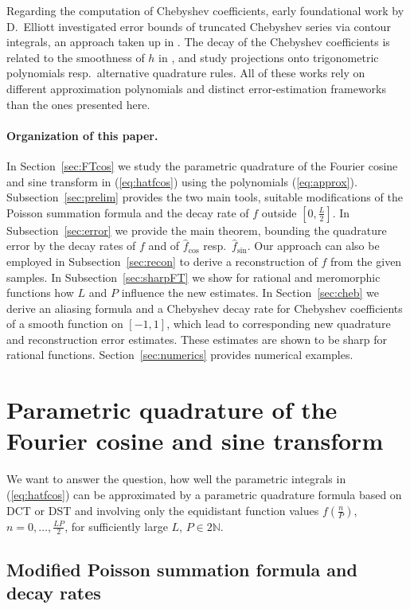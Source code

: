 \documentclass[11pt,a4paper]{scrartcl}
\numberwithin{equation}{section}
\numberwithin{table}{section}
\numberwithin{figure}{section}
\newcommand{\N}{\mathbb N}
\newcommand{\fcos}{{\hat f}_{\cos}}
\newcommand{\fsin}{{\hat f}_{\sin}}
\begin{document}
Regarding the computation of Chebyshev coefficients, early foundational work by D.~Elliott
\cite{El63, El64, El65} investigated error bounds of truncated Chebyshev series via contour
integrals, an approach taken up in \cite{Wang17}. The decay of the Chebyshev coefficients is related to the
smoothness of $h$ in \cite{Ma17}, and \cite{Liu19, Po25} study projections onto trigonometric
polynomials resp.\ alternative quadrature rules. All of these works rely on different
approximation polynomials and distinct error-estimation frameworks than the ones presented here.

\paragraph{Organization of this paper.}
 In Section~\ref{sec:FTcos} we study the parametric quadrature of the Fourier cosine and sine transform
in (\ref{eq:hatfcos}) using the polynomials (\ref{eq:approx}). Subsection~\ref{sec:prelim} provides
the two main tools, suitable modifications of the Poisson summation formula and the decay rate of
$f$ outside $[0,\frac L2]$. In Subsection~\ref{sec:error} we provide the main theorem, bounding the
quadrature error by the decay rates of $f$ and of $\fcos$ resp.\ $\fsin$.
Our approach can also be employed in  Subsection~\ref{sec:recon}
to derive a reconstruction of $f$ from the given samples.
In  Subsection~\ref{sec:sharpFT} we show for
rational and meromorphic functions how $L$ and $P$ influence the new estimates.
In Section~\ref{sec:cheb}
we derive an aliasing formula and a Chebyshev decay rate for
Chebyshev coefficients of a smooth function on $[-1,1]$, which lead to corresponding
new quadrature and reconstruction error estimates.
These estimates are shown to be sharp for rational functions.
Section~\ref{sec:numerics} provides numerical examples.

\section{Parametric quadrature of the Fourier cosine and sine transform\label{sec:FTcos}}

We want to answer the question, how well the parametric integrals in (\ref{eq:hatfcos}) can be approximated by a parametric quadrature formula based on DCT or DST and involving only the equidistant function values $f(\tfrac{n}{P})$, $n=0, \ldots , \frac{LP}{2}$, for sufficiently large $L$, $P \in 2\N$.

\subsection{Modified Poisson summation formula and decay rates\label{sec:prelim}}
\end{document}

